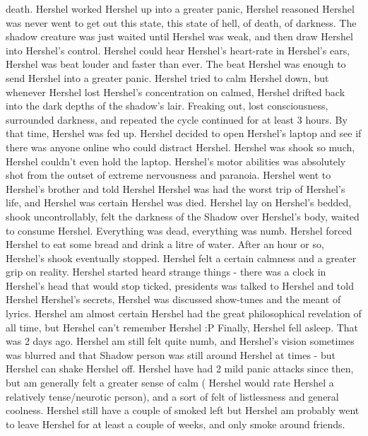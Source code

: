 \documentclass[12pt]{book}
\begin{document}
death. Hershel worked Hershel up into a greater panic, Hershel reasoned Hershel was never went to get out this state, this state of hell, of death, of darkness. The shadow creature was just waited until Hershel was weak, and then draw Hershel into Hershel's control. Hershel could hear Hershel's heart-rate in Hershel's ears, Hershel was beat louder and faster than ever. The beat Hershel was enough to send Hershel into a greater panic. Hershel tried to calm Hershel down, but whenever Hershel lost Hershel's concentration on calmed, Hershel drifted back into the dark depths of the shadow's lair. Freaking out, lost consciousness, surrounded darkness, and repeated the cycle continued for at least 3 hours. By that time, Hershel was fed up. Hershel decided to open Hershel's laptop and see if there was anyone online who could distract Hershel. Hershel was shook so much, Hershel couldn't even hold the laptop. Hershel's motor abilities was absolutely shot from the outset of extreme nervousness and paranoia. Hershel went to Hershel's brother and told Hershel Hershel was had the worst trip of Hershel's life, and Hershel was certain Hershel was died. Hershel lay on Hershel's bedded, shook uncontrollably, felt the darkness of the Shadow over Hershel's body, waited to consume Hershel. Everything was dead, everything was numb. Hershel forced Hershel to eat some bread and drink a litre of water. After an hour or so, Hershel's shook eventually stopped. Hershel felt a certain calmness and a greater grip on reality. Hershel started heard strange things - there was a clock in Hershel's head that would stop ticked, presidents was talked to Hershel and told Hershel Hershel's secrets, Hershel was discussed show-tunes and the meant of lyrics. Hershel am almost certain Hershel had the great philosophical revelation of all time, but Hershel can't remember Hershel :P Finally, Hershel fell asleep. That was 2 days ago. Hershel am still felt quite numb, and Hershel's vision sometimes was blurred and that Shadow person was still around Hershel at times - but Hershel can shake Hershel off. Hershel have had 2 mild panic attacks since then, but am generally felt a greater sense of calm ( Hershel would rate Hershel a relatively tense/neurotic person), and a sort of felt of listlessness and general coolness. Hershel still have a couple of smoked left but Hershel am probably went to leave Hershel for at least a couple of weeks, and only smoke around friends.
\end{document}
